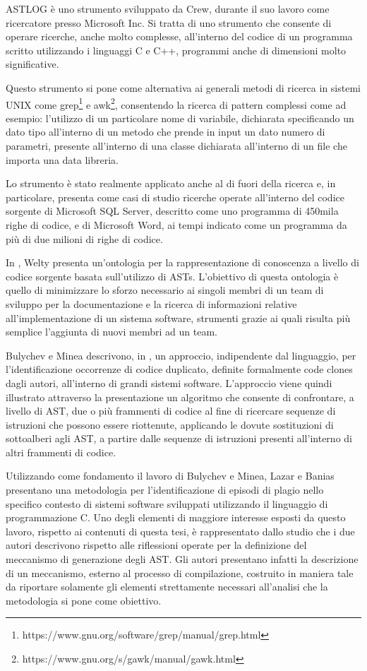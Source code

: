 ASTLOG è uno strumento sviluppato da Crew, durante il suo lavoro come
ricercatore presso Microsoft Inc. Si tratta di uno strumento che consente di
operare ricerche, anche molto complesse, all’interno del codice di un programma
scritto utilizzando i linguaggi C e C++, programmi anche di dimensioni molto
significative. \cite{DBLP:conf/dsl/Crew97}

Questo strumento si pone come alternativa ai generali metodi di ricerca in
sistemi UNIX come
grep\footnote{https://www.gnu.org/software/grep/manual/grep.html} e
awk\footnote{https://www.gnu.org/s/gawk/manual/gawk.html}, consentendo la
ricerca di pattern complessi come ad esempio: l’utilizzo di un particolare nome
di variabile, dichiarata specificando un dato tipo all’interno di un metodo che
prende in input un dato numero di parametri, presente all’interno di una classe
dichiarata all’interno di un file che importa una data libreria.

Lo strumento è stato realmente applicato anche al di fuori della ricerca e, in
particolare, \cite{DBLP:conf/dsl/Crew97} presenta come casi di studio ricerche
operate all’interno del codice sorgente di Microsoft SQL Server, descritto come
uno programma di 450mila righe di codice, e di Microsoft Word, ai tempi indicato
come un programma da più di due milioni di righe di codice.

In \cite{DBLP:conf/kbse/Welty97}, Welty presenta un’ontologia per la
rappresentazione di conoscenza a livello di codice sorgente basata sull’utilizzo
di ASTs. L’obiettivo di questa ontologia è quello di minimizzare lo sforzo
necessario ai singoli membri di un team di sviluppo per la documentazione e la
ricerca di informazioni relative all’implementazione di un sistema software,
strumenti grazie ai quali risulta più semplice l’aggiunta di nuovi membri ad un
team.

Bulychev e Minea descrivono, in \cite{peter2008duplicate}, un approccio,
indipendente dal linguaggio, per l’identificazione occorrenze di codice
duplicato, definite formalmente code clones dagli autori, all’interno di grandi
sistemi software. L’approccio viene quindi illustrato attraverso la
presentazione un algoritmo che consente di confrontare, a livello di AST, due o
più frammenti di codice al fine di ricercare sequenze di istruzioni che possono
essere riottenute, applicando le dovute sostituzioni di sottoalberi agli AST, a
partire dalle sequenze di istruzioni presenti all’interno di altri frammenti di
codice.

Utilizzando come fondamento il lavoro di Bulychev e Minea, Lazar e Banias
presentano una metodologia \cite{DBLP:conf/saci/LazarB14} per l’identificazione
di episodi di plagio nello specifico contesto di sistemi software sviluppati
utilizzando il linguaggio di programmazione C. Uno degli elementi di maggiore
interesse esposti da questo lavoro, rispetto ai contenuti di questa tesi, è
rappresentato dallo studio che i due autori descrivono rispetto alle riflessioni
operate per la definizione del meccanismo di generazione degli AST. Gli autori
presentano infatti la descrizione di un meccanismo, esterno al processo di
compilazione, costruito in maniera tale da riportare solamente gli elementi
strettamente necessari all’analisi che la metodologia si pone come obiettivo.

